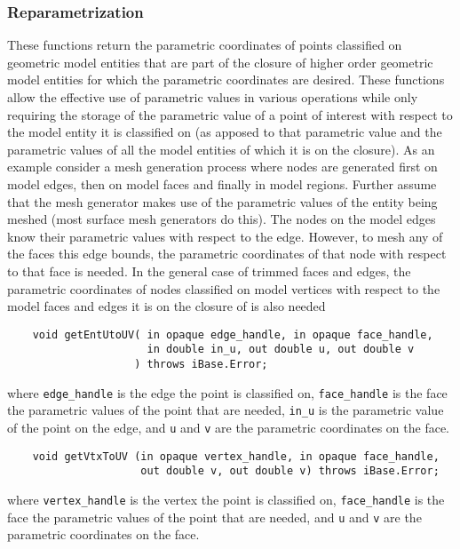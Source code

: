 \documentclass{article}
\begin{document}
\subsubsection{Reparametrization}
These functions return the parametric coordinates of points 
classified on geometric model entities that are part of the closure 
of higher order geometric model entities for which the parametric 
coordinates are desired. These functions allow the effective 
use of parametric values in various operations while only requiring 
the storage of the parametric value of a point of interest with 
respect to the model entity it is classified on (as apposed to 
that parametric value and the parametric values of all the model 
entities of which it is on the closure). As an example consider 
a mesh generation process where nodes are generated first on 
model edges, then on model faces and finally in model regions. 
Further assume that the mesh generator makes use of the parametric 
values of the entity being meshed (most surface mesh generators 
do this). The nodes on the model edges know their parametric 
values with respect to the edge. However, to mesh any of the 
faces this edge bounds, the parametric coordinates of that node 
with respect to that face is needed. In the general case of trimmed 
faces and edges, the parametric coordinates of nodes classified 
on model vertices with respect to the model faces and edges it 
is on the closure of is also needed

\begin{verbatim}
    void getEntUtoUV( in opaque edge_handle, in opaque face_handle,  
                      in double in_u, out double u, out double v
                    ) throws iBase.Error;
\end{verbatim}
where {\tt edge\_handle} is the edge the point is classified 
on, {\tt face\_handle} is the face the parametric values of 
the point that are needed, {\tt in\_u} is the parametric value of 
the point on the edge, and {\tt u} and {\tt v} are the parametric 
coordinates on the face.

\begin{verbatim}
    void getVtxToUV (in opaque vertex_handle, in opaque face_handle, 
                     out double v, out double v) throws iBase.Error;

\end{verbatim}
where {\tt vertex\_handle} is the vertex the point is classified 
on, {\tt face\_handle} is the face the parametric values of 
the point that are needed, and {\tt u} and {\tt v} are the parametric coordinates 
on the face.
\end{document}
